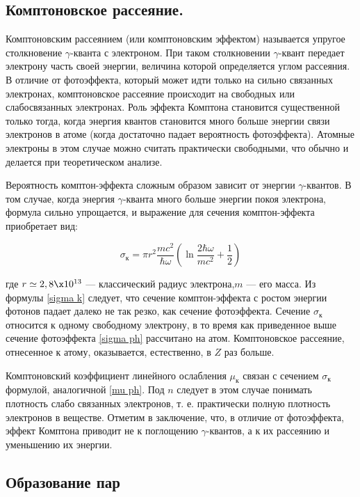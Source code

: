 \documentclass[12pt]{kiarticle} %
\newcommand{\ga}{\ensuremath{\gamma}}
\begin{document}
	\subsection{Комптоновское рассеяние.} Комптоновским рассеянием (или комптоновским эффектом) называется упругое столкновение \ga-кванта с электроном. При таком столкновении \ga-квант передает электрону часть своей энергии, величина которой определяется углом рассеяния. В отличие от фотоэффекта, который может идти только на сильно связанных электронах, комптоновское рассеяние происходит на свободных или слабосвязанных электронах. Роль эффекта Комптона становится
	существенной только тогда, когда энергия квантов становится много
	больше энергии связи электронов в атоме (когда достаточно падает
	вероятность фотоэффекта). Атомные электроны в этом случае можно
	считать практически свободными, что обычно и делается при теоретическом анализе.
	
	Вероятность комптон-эффекта сложным образом зависит от энергии \ga-квантов. В том случае, когда энергия
	\ga-кванта много больше энергии покоя электрона, формула сильно
	упрощается, и выражение для сечения комптон-эффекта приобретает  вид:
	
	\begin{equation}\label{sigma k}
	\sigma_к = \pi r^2 \dfrac{mc^2}{\hbar\omega} \left( \ln{\dfrac{2\hbar\omega}{mc^2} + \dfrac{1}{2}} \right) 
	\end{equation}
	
	где $ r \simeq 2,8 \x 10^{13} $ --- классический радиус электрона,$ m $ --- его масса. Из формулы \eqref{sigma k} следует, что сечение комптон-эффекта с ростом энергии фотонов падает далеко не так резко, как сечение фотоэффекта.
	Сечение $ \sigma_к $ относится к одному свободному электрону, в то время как приведенное выше сечение фотоэффекта \eqref{sigma ph} рассчитано на атом.
	Комптоновское рассеяние, отнесенное к атому, оказывается, естественно, в $ Z $ раз больше. 
	
	Комптоновский коэффициент линейного ослабления $ \mu_к $ связан с
	сечением $ \sigma_к $ формулой, аналогичной \eqref{mu ph}. Под $ n $ следует в этом случае понимать плотность слабо связанных электронов, т. е. практически полную плотность электронов в веществе.
	Отметим в заключение, что, в отличие от фотоэффекта, эффект
	Комптона приводит не к поглощению \ga-квантов, а к их рассеянию и
	уменьшению их энергии.
	
	\subsection{Образование пар}
	
\end{document}
